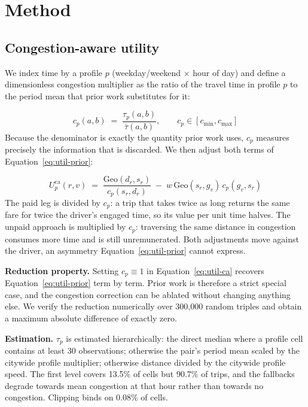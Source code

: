 \documentclass[10pt,twocolumn]{article}
\begin{document}
\section{Method}
\subsection{Congestion-aware utility}
We index time by a profile \(p\) (weekday/weekend \(\times\) hour of day) and define a dimensionless congestion multiplier as the ratio of the travel time in profile \(p\) to the period mean that prior work substitutes for it:

\begin{equation}\label{eq:cong}
c_p(a,b) \;=\; \frac{\tau_p(a,b)}{\bar{\tau}(a,b)}, \qquad c_p \in [c_{\min}, c_{\max}]
\end{equation}
Because the denominator is exactly the quantity prior work uses, \(c_p\) measures precisely the information that is discarded. We then adjust both terms of Equation~\ref{eq:util-prior}:

\begin{equation}\label{eq:util-ca}
U^{\mathrm{ca}}_p(r,v) \;=\; \frac{\mathrm{Geo}(d_r,s_r)}{c_p(s_r,d_r)} \;-\; w\,\mathrm{Geo}(s_r,g_v)\,c_p(g_v,s_r)
\end{equation}
The paid leg is divided by \(c_p\): a trip that takes twice as long returns the same fare for twice the driver's engaged time, so its value per unit time halves. The unpaid approach is multiplied by \(c_p\): traversing the same distance in congestion consumes more time and is still unremunerated. Both adjustments move against the driver, an asymmetry Equation~\ref{eq:util-prior} cannot express.

\textbf{Reduction property.} Setting \(c_p \equiv 1\) in Equation~\ref{eq:util-ca} recovers Equation~\ref{eq:util-prior} term by term. Prior work is therefore a strict special case, and the congestion correction can be ablated without changing anything else. We verify the reduction numerically over 300{,}000 random triples and obtain a maximum absolute difference of exactly zero.

\textbf{Estimation.} \(\tau_p\) is estimated hierarchically: the direct median where a profile cell contains at least 30 observations; otherwise the pair's period mean scaled by the citywide profile multiplier; otherwise distance divided by the citywide profile speed. The first level covers 13.5\% of cells but 90.7\% of trips, and the fallbacks degrade towards mean congestion at that hour rather than towards no congestion. Clipping binds on 0.08\% of cells.
\end{document}
